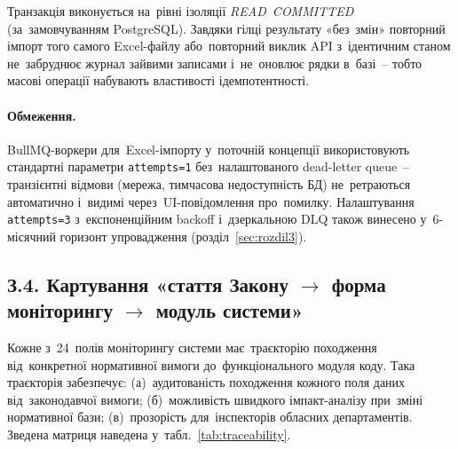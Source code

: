 Транзакція виконується на~рівні ізоляції \emph{READ~COMMITTED} (за~замовчуванням PostgreSQL). Завдяки гілці результату «без~змін» повторний імпорт того самого Excel-файлу або~повторний виклик API з~ідентичним станом не~забруднює журнал зайвими записами і~не~оновлює рядки в~базі~-- тобто масові операції набувають властивості ідемпотентності.

\paragraph{Обмеження.} BullMQ-воркери для~Excel-імпорту у~поточній концепції використовують стандартні параметри \texttt{attempts=1} без~налаштованого dead-letter queue~-- транзієнтні відмови (мережа, тимчасова недоступність БД) не~ретраються автоматично і~видимі через~UI-повідомлення про~помилку. Налаштування \texttt{attempts=3} з~експоненційним backoff і~дзеркальною DLQ також винесено у~6-місячний горизонт упровадження (розділ~\ref{sec:rozdil3}).

\subsection*{З.4. Картування «стаття Закону $\to$ форма моніторингу $\to$ модуль системи»}
\label{app:traceability}

Кожне з~24~полів моніторингу системи має~траєкторію походження від~конкретної нормативної вимоги до~функціонального модуля коду. Така траєкторія забезпечує: (а)~аудитованість походження кожного поля даних від~законодавчої вимоги; (б)~можливість швидкого імпакт-аналізу при~зміні нормативної бази; (в)~прозорість для~інспекторів обласних департаментів. Зведена матриця наведена у~табл.~\ref{tab:traceability}.

